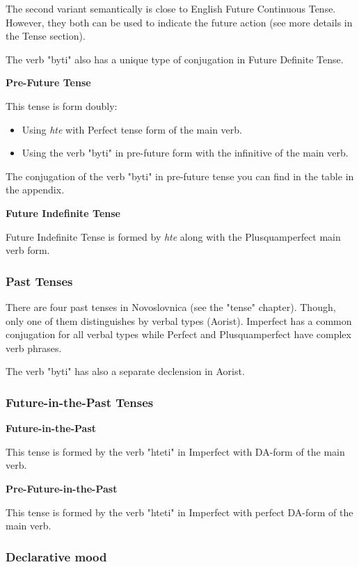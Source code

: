 The second variant semantically is close to English Future Continuous Tense. However, they both can be used to indicate the future action (see more details in the Tense section).

The verb "byti" also has a unique type of conjugation in Future Definite Tense.

\textbf{Pre-Future Tense}

This tense is form doubly: 

\begin{itemize}
	\item Using \textit{hte} with Perfect tense form of the main verb.
	\item Using the verb "byti" in pre-future form with the infinitive of the main verb.
\end{itemize}

The conjugation of the verb "byti" in pre-future tense you can find in the table in the appendix.

\textbf{Future Indefinite Tense}

Future Indefinite Tense is formed by \textit{hte} along with the Plusquamperfect main verb form.

\subsubsection{Past Tenses}

There are four past tenses in Novoslovnica (see the "tense" chapter). Though, only one of them distinguishes by verbal types (Aorist). Imperfect has a common conjugation for all verbal types while Perfect and Plusquamperfect have complex verb phrases.

The verb "byti" has also a separate declension in Aorist.

\subsubsection{Future-in-the-Past Tenses}

\textbf{Future-in-the-Past}

This tense is formed by the verb "hteti" in Imperfect with DA-form of the main verb.

\textbf{Pre-Future-in-the-Past}

This tense is formed by the verb "hteti" in Imperfect with perfect DA-form of the main verb.

\subsubsection{Declarative mood}

